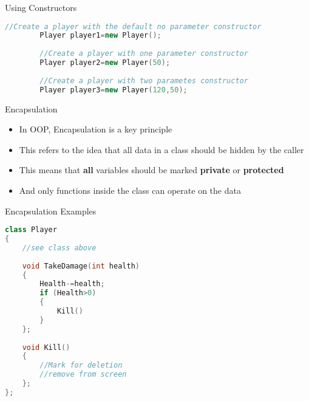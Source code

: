 \begin{frame}[fragile]{Using Constructors}
	\begin{lstlisting}[language=C++,basicstyle=\tiny,]
		//Create a player with the default no parameter constructor
		Player player1=new Player();
		
		//Create a player with one parameter constructor
		Player player2=new Player(50);
		
		//Create a player with two parametes constructor
		Player player3=new Player(120,50);
	\end{lstlisting}
\end{frame}

\begin{frame}{Encapsulation}
	\begin{itemize}
		\pause \item In OOP, Encapsulation is a key principle 
		\pause \item This refers to the idea that all data in a class should be hidden by the caller
		\pause \item This means that \textbf{all} variables should be marked \textbf{private} or \textbf{protected}
		\pause \item And only functions inside the class can operate on the data
	\end{itemize}
\end{frame}

\begin{frame}[fragile]{Encapsulation Examples}
\begin{lstlisting}[language=C++,basicstyle=\tiny,]
class Player
{
	//see class above
	
	void TakeDamage(int health)
	{
		Health-=health;
		if (Health>0)
		{
			Kill()
		}
	};
	
	void Kill()
	{
		//Mark for deletion
		//remove from screen
	};
};
	\end{lstlisting}
\end{frame}

